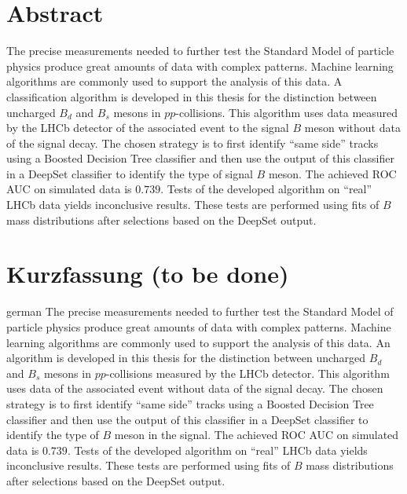 \thispagestyle{plain}

\section*{Abstract} %
The precise measurements needed to further test the Standard Model of particle physics produce great amounts of data with complex patterns.
Machine learning algorithms are commonly used to support the analysis of this data.
A classification algorithm is developed in this thesis for the distinction between uncharged $B_d$ and $B_s$ mesons in $pp$-collisions.
This algorithm uses data measured by the LHCb detector of the associated event to the signal $B$ meson without data of the signal decay. %
The chosen strategy is to first identify \enquote{same side} tracks using a Boosted Decision Tree classifier and then use the output of this classifier in a DeepSet classifier to identify the type of signal $B$ meson.
The achieved ROC AUC on simulated data is $0.739$.
Tests of the developed algorithm on \enquote{real} LHCb data yields inconclusive results.
These tests are performed using fits of $B$ mass distributions after selections based on the DeepSet output.

\section*{Kurzfassung (to be done)} %
\begin{foreignlanguage}{german}
    The precise measurements needed to further test the Standard Model of particle physics produce great amounts of data with complex patterns.
    Machine learning algorithms are commonly used to support the analysis of this data.
    An algorithm is developed in this thesis for the distinction between uncharged $B_d$ and $B_s$ mesons in $pp$-collisions measured by the LHCb detector.
    This algorithm uses data of the associated event without data of the signal decay. %
    The chosen strategy is to first identify \enquote{same side} tracks using a Boosted Decision Tree classifier and then use the output of this classifier in a DeepSet classifier to identify the type of $B$ meson in the signal.
    The achieved ROC AUC on simulated data is $0.739$.
    Tests of the developed algorithm on \enquote{real} LHCb data yields inconclusive results.
    These tests are performed using fits of $B$ mass distributions after selections based on the DeepSet output.
\end{foreignlanguage}
